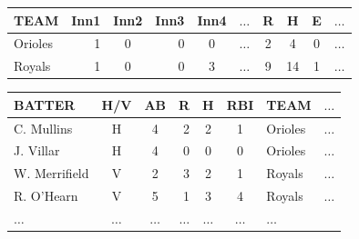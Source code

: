 \documentclass[11pt,a4paper]{article}
\newcommand{\lform}[1]{\textsf{\scriptsize{#1}}}
\begin{document}
\begin{figure*}
\begin{small}
\begin{minipage}{0.4\textwidth}
\hspace*{.3cm}\begin{tabular}{@{}l@{~~}r@{~~}c@{~~}r@{~~}c@{~~}c@{~~}c@{~~}c@{~~}c@{~~}l@{}} \hline
\lform{TEAM}      & \lform{Inn1} &\lform{Inn2} &\lform{Inn3} & \lform{Inn4} & \lform{$\dots$} & \lform{R}& \lform{H} & \lform{E} & \lform{$\dots$} \\ \hline
\lform{Orioles} &\lform{1} &\lform{0} &\lform{0} & \lform{0} & \lform{$\dots$} & \lform{2} & \lform{4} & \lform{0} & \lform{$\dots$} \\ 
\lform{Royals} &\lform{1} &\lform{0} &\lform{0} & \lform{3} &\lform{$\dots$} & \lform{9} & \lform{14} & \lform{1} & \lform{$\dots$} \\ \hline
\end{tabular}


\vspace{.3cm}
\hspace*{.3cm}\begin{tabular}{@{}l@{~~}c@{~~}c@{~}r@{~~}c@{~~}c@{~~}l@{~~}l@{}} \hline
\lform{BATTER} & \lform{H/V} & \lform{AB} & \lform{R} & \lform{H}& \lform{RBI} &  \lform{TEAM} & \lform{$\dots$}\\ \hline
\lform{C. Mullins} & \lform{H} & \lform{4} & \lform{2} & \lform{2}& \lform{1} &   \lform{Orioles} & \lform{$\dots$}\\
\lform{J. Villar} & \lform{H} & \lform{4} & \lform{0} & \lform{0}& \lform{0} & \lform{Orioles} & \lform{$\dots$}\\
\lform{W. Merrifield} & \lform{V}& \lform{2} & \lform{3} & \lform{2} & \lform{1}& \lform{Royals} & \lform{$\dots$}\\
\lform{R. O'Hearn} & \lform{V}& \lform{5} & \lform{1} & \lform{3} & \lform{4}&  \lform{Royals} & \lform{$\dots$}\\

\lform{$\dots$} & \lform{$\dots$} & \lform{$\dots$} & \lform{$\dots$} &  \lform{$\dots$} &  \lform{$\dots$} & \lform{$\dots$}\\\hline
\end{tabular}


\end{minipage}
\end{small}
\end{figure*}
\end{document}
